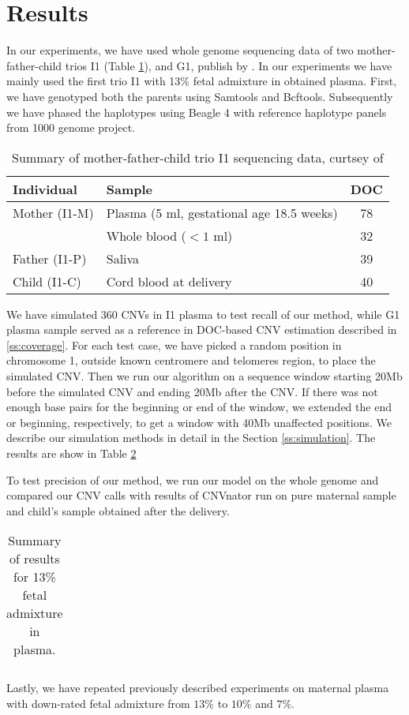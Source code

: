 \section{Results}
In our experiments, we have used whole genome sequencing data of two mother-father-child trios I1 (Table \ref{tab:I1}), and G1, publish by \cite{kitzman2012}. In our experiments we have mainly used the first trio I1 with 13\% fetal admixture in obtained plasma. First, we have genotyped both the parents using Samtools and Bcftools. Subsequently we have phased the haplotypes using Beagle 4 \cite{browning2013} with reference haplotype panels from 1000 genome project.

\begin{table}[t]
\centering
\begin{tabular}{l|l|c}
Individual & Sample & DOC \\ \hline
Mother (I1-M) & Plasma (5 ml, gestational age 18.5 weeks) & 78 \\
	& Whole blood ($<1$ ml) & 32 \\
Father (I1-P) & Saliva & 39 \\
Child (I1-C) & Cord blood at delivery & 40
\end{tabular}
\vspace{3pt}
\caption{Summary of mother-father-child trio I1 sequencing data, curtsey of \cite{kitzman2012}  }
\label{tab:I1} 
\end{table}

We have simulated 360 CNVs in I1 plasma to test recall of our method, while G1 plasma sample served as a reference in DOC-based CNV estimation described in \ref{ss:coverage}. For each test case, we have picked a random position in chromosome 1, outside known centromere and telomeres region, to place the simulated CNV. Then we run our algorithm on a sequence window starting 20Mb before the simulated CNV and ending 20Mb after the CNV. If there was not enough base pairs for the beginning or end of the window, we extended the end or beginning, respectively, to get a window with 40Mb unaffected positions. We describe our simulation methods in detail in the Section \ref{ss:simulation}. The results are show in Table \ref{tab:resff13}

To test precision of our method, we run our model on the whole genome and compared our CNV calls with results of CNVnator \cite{abyzov2011cnvnator} run on pure maternal sample and child's sample obtained after the delivery.

\begin{table}[t]
\centering
{}
\begin{tabular}{l|l|c}
\end{tabular}
\caption{Summary of results for 13\% fetal admixture in plasma. }
\label{tab:resff13} 
\end{table}

Lastly, we have repeated previously described experiments on maternal plasma with down-rated fetal admixture from $13\%$ to $10\%$ and $7\%$.




